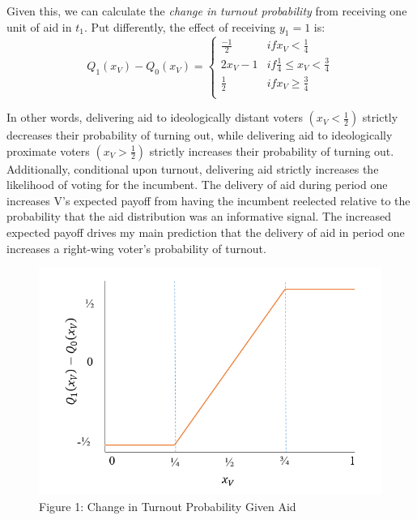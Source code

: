 \documentclass[12pt]{paper}
\begin{document}
Given this, we can calculate the \emph{change in turnout probability} from receiving one unit of aid in $t_1$. Put differently, the effect of receiving $y_1 = 1$ is:
\begin{equation}
Q_1 (x_V ) - Q_0 (x_V )=
\begin{cases}
\frac{-1}{2} & if x_V < \frac{1}{4}\\    
2x_V - 1 & if \frac{1}{4} \leq x_V < \frac{3}{4}  \\
\frac{1}{2} & if x_V \geq \frac{3}{4}  \\
\end{cases}
\end{equation}

In other words, delivering aid to ideologically distant voters $(x_V < \frac{1}{2})$ strictly decreases their probability of turning out, while delivering aid to ideologically proximate voters $(x_V > \frac{1}{2})$  strictly increases their probability of turning out. Additionally, conditional upon turnout, delivering aid strictly increases the likelihood of voting for the incumbent. The delivery of aid during period one increases V’s expected payoff from having the incumbent reelected relative to the probability that the aid distribution was an informative signal. The increased expected payoff drives my main prediction that the delivery of aid in period one increases a right-wing voter's probability of turnout.

\begin{figure}
	\includegraphics[width=\linewidth]{Figs/equilibrium.png}
	\caption{Figure 1: Change in Turnout Probability Given Aid}
	\label{Figure 1: Change in Turnout Probability Given Aid}
\end{figure}
\end{document}
